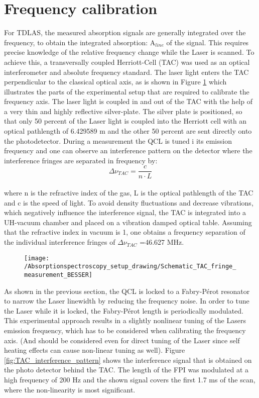 \section{Frequency calibration}
\label{sec:frequency_calibration}
For TDLAS, the measured absorption signals are generally integrated over the frequency, to obtain the integrated absorption: A$_{line}$ of the signal. This requires precise knowledge of the relative frequency change while the Laser is scanned. To achieve this, a transversally coupled Herriott-Cell (TAC) was used as an optical interferometer and absolute frequency standard. The laser light enters the TAC perpendicular to the classical optical axis, as is shown in Figure \ref{fig:TAC_experimental_setup} which illustrates the parts of the experimental setup that are required to calibrate the frequency axis. The laser light is coupled in and out of the TAC with the help of a very thin and highly reflective silver-plate. The silver plate is positioned, so that only 50 percent of the Laser light is coupled into the Herriott cell with an optical pathlength of 6.429589 m and the other 50 percent are sent directly onto the photodetector. During a measurement the QCL is tuned i its emission frequency and one can observe an interference pattern on the detector where the interference fringes are separated in frequency by:
\begin{equation}
	\Delta \nu_{TAC}= \frac{c}{n\cdot L}
\end{equation}\\
where n is the refractive index of the gas, L is the optical pathlength of the TAC and c is the speed of light. To avoid density fluctuations and decrease vibrations, which negatively influence the interference signal, the TAC is integrated into a UH-vacuum chamber and placed on a vibration damped optical table.
Assuming that the refractive index in vacuum is 1, one obtains a frequency separation of the individual interference fringes of $\Delta \nu_{TAC}$ =46.627 MHz.
\begin{figure}[H]
	\centering
	\texttt{[image: /Absorptionspectroscopy\_setup\_drawing/Schematic\_TAC\_fringe\_measurement\_BESSER]}
	\caption{}
	\label{fig:TAC_experimental_setup}
\end{figure}
\noindent
As shown in the previous section, the QCL is locked to a Fabry-Pérot resonator to narrow the Laser linewidth by reducing the frequency noise. In order to tune the Laser while it is locked, the Fabry-Pérot length is periodically modulated. This experimental approach results in a slightly nonlinear tuning of the Lasers emission frequency, which has to be considered when calibrating the frequency axis. (And should be considered even for direct tuning of the Laser since self heating effects can cause non-linear tuning as well). Figure \ref{fig:TAC_interference_pattern} shows the interference signal that is obtained on the photo detector behind the TAC. The length of the FPI was modulated at a high frequency of 200 Hz and the shown signal covers the first 1.7 ms of the scan, where the non-linearity is most significant. \\\\
